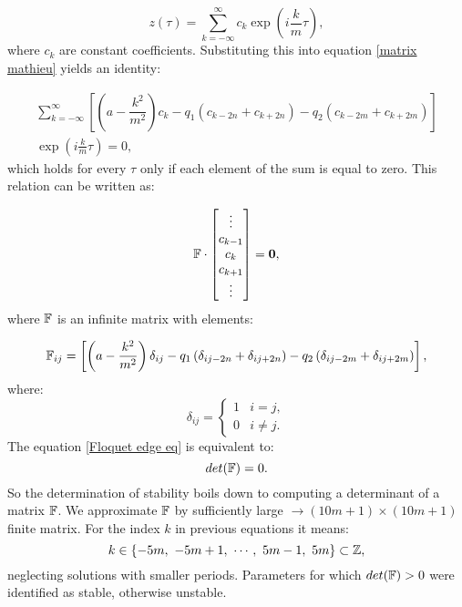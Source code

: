 \begin{equation}
	\label{Floquet ansatz}
	z(\tau) = \sum_{k=-\infty}^{\infty} c_k \exp(i\frac{k}{m}\tau),
\end{equation}
where $c_k$ are constant coefficients. Substituting this into equation \eqref{matrix mathieu} yields an identity:

\begin{multline}
	\sum_{k=-\infty}^{\infty}\left[ \left(a - \dfrac{k^2}{m^2} \right)c_k - q_1 \left(c_{k-2n} + c_{k+2n} \right) - q_2 \left(c_{k-2m} + c_{k+2m} \right)  \right] \\ \exp(i\frac{k}{m}\tau) = 0,
\end{multline}
which holds for every $\tau$ only if each element of the sum is equal to zero. This relation can be written as:

\begin{equation}
	\label{Floquet edge eq}
	\mathbb{F} \cdot \begin{bmatrix}
	\vdots \\
	c_{k-1} \\
	c_{k} \\
	c_{k+1} \\
	\vdots
	\end{bmatrix} = \vb{0},
\end{equation}
where $\mathbb{F}$ is an infinite matrix with elements:

\begin{equation}
	\mathbb{F}_{i j} = \left[ \left(a - \dfrac{k^2}{m^2} \right)\delta_{i j} - q_1 \left(\delta_{i j-2n} + \delta_{i j+2n} \right) - q_2 \left(\delta_{i j-2m} + \delta_{i j+2m} \right)  \right],
\end{equation} 
where:
\begin{equation}
	\delta_{ij} = 
	\begin{cases}
		1 & i=j, \\
		0 & i \neq j.
	\end{cases}	
\end{equation}
The equation \eqref{Floquet edge eq} is equivalent to:
\begin{equation}
	\label{Floquet determinant}
	det(\mathbb{F}) = 0.
\end{equation}
So the determination of stability boils down to computing a determinant of a matrix $\mathbb{F}$. We approximate $\mathbb{F}$ by sufficiently large $\rightarrow (10m+1) \times (10m+1)$ finite matrix. For the index $k$ in previous equations it means: $$k \in \{ -5m, \ -5m+1, \  \cdots, \ 5m-1, \ 5m \} \subset \mathbb{Z},$$ neglecting solutions with smaller periods. Parameters for which $det(\mathbb{F}) > 0$ were identified as stable, otherwise unstable.
 	
